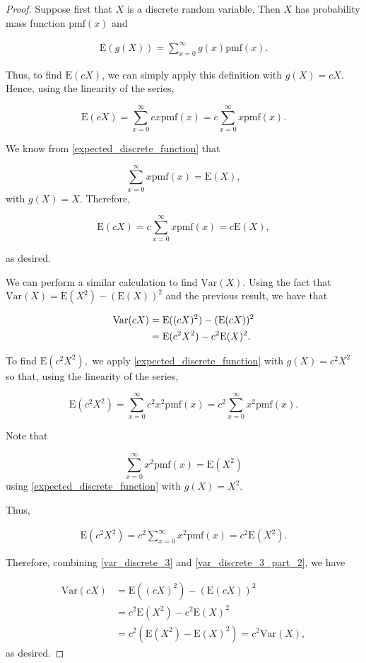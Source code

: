 \documentclass[12pt]{article}
\theoremstyle{definition}
\newcommand{\E}{\text{E}}
\newcommand{\V}{\text{Var}}
\newcommand{\pmf}{\text{pmf}}
\begin{document}
\begin{proof}
  Suppose first that $X$ is a discrete random variable. Then $X$ has probability
  mass function $\pmf(x)$ and

  \begin{align}\label{expected_discrete_function}
    \E(g(X)) = \sum_{x=0}^{\infty} g(x) \pmf(x).
  \end{align}

  Thus, to find $\E(cX)$, we can simply apply this definition with $g(X) = cX.$
  Hence, using the linearity of the series,

  \[
    \E(cX) = \sum_{x=0}^{\infty} cx \pmf(x) = c \sum_{x=0}^{\infty} x \pmf(x).
  \]

  We know from \eqref{expected_discrete_function} that

  \[
    \sum_{x=0}^{\infty} x \pmf(x) = \E(X),
  \]
  with $g(X) = X.$ Therefore,

  \[
    \E(cX) = c \sum_{x=0}^{\infty} x \pmf(x) = c\E(X),
  \]

  as desired.

  We can perform a similar calculation to find $\V(X).$ Using the fact that
  $\V(X) = \E(X^2) - (\E(X))^2$ and the previous result, we have that

  \begin{align}\label{var_discrete_3}
    \V(cX) &= \E((cX)^2) - (\E(cX))^2 \notag \\
    &= \E(c^2X^2) - c^2\E(X)^2.
  \end{align}

  To find $\E(c^2X^2),$ we apply \eqref{expected_discrete_function} with
  $g(X) = c^2X^2$ so that, using the linearity of the series,

  \[
    \E(c^2X^2) = \sum_{x=0}^{\infty} c^2x^2 \pmf(x) = c^2\sum_{x=0}^{\infty} x^2 \pmf(x).
  \]

  Note that

  \[
    \sum_{x=0}^{\infty} x^2 \pmf(x) = \E(X^2)
  \]
  using \eqref{expected_discrete_function} with $g(X) = X^2.$

  Thus,

  \begin{align}\label{var_discrete_3_part_2}
    \E(c^2X^2) = c^2\sum_{x=0}^{\infty} x^2 \pmf(x) = c^2\E(X^2).
  \end{align}

  Therefore, combining \eqref{var_discrete_3} and \eqref{var_discrete_3_part_2},
  we have

  \begin{align*}
    \V(cX)
    &= \E((cX)^2) - (\E(cX))^2 \\
    &= c^2\E(X^2) - c^2\E(X)^2 \\
    &= c^2(\E(X^2) - \E(X)^2) = c^2\V(X),
  \end{align*}
  as desired.


\end{proof}
\end{document}
